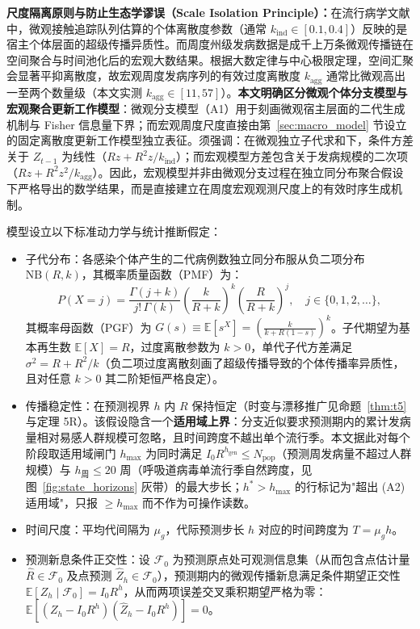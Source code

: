 \documentclass[11pt,a4paper]{article}
\theoremstyle{plain}
\theoremstyle{definition}
\begin{document}
\noindent\textbf{尺度隔离原则与防止生态学谬误（Scale Isolation Principle）：}在流行病学文献中，微观接触追踪队列估算的个体离散度参数（通常 $k_{\text{ind}} \in [0.1, 0.4]$）反映的是宿主个体层面的超级传播异质性\citep{lloyd-smith2005superspreading}。而周度州级发病数据是成千上万条微观传播链在空间聚合与时间池化后的宏观大数结果。根据大数定律与中心极限定理，空间汇聚会显著平抑离散度，故宏观周度发病序列的有效过度离散度 $k_{\text{agg}}$ 通常比微观高出一至两个数量级（本文实测 $k_{\text{agg}} \in [11, 57]$）。\textbf{本文明确区分微观个体分支模型与宏观聚合更新工作模型}：微观分支模型（A1）用于刻画微观宿主层面的二代生成机制与 Fisher 信息量下界；而宏观周度尺度直接由第~\ref{sec:macro_model} 节设立的固定离散度更新工作模型独立表征。须强调：在微观独立子代求和下，条件方差关于 $Z_{t-1}$ 为线性（$Rz + R^2 z / k_{\text{ind}}$）；而宏观模型方差包含关于发病规模的二次项（$Rz + R^2 z^2 / k_{\text{agg}}$）。因此，宏观模型并非由微观分支过程在独立同分布聚合假设下严格导出的数学结果，而是直接建立在周度宏观观测尺度上的有效时序生成机制。

模型设立以下标准动力学与统计推断假定：
\begin{itemize}
\item[(A1)] 子代分布：各感染个体产生的二代病例数独立同分布服从负二项分布 $\text{NB}(R, k)$，其概率质量函数（PMF）为：
\begin{equation}
P(X = j) = \frac{\Gamma(j+k)}{j!\,\Gamma(k)} \left(\frac{k}{R+k}\right)^k \left(\frac{R}{R+k}\right)^j, \quad j \in \{0, 1, 2, \dots\},
\label{eq:nb_pmf}
\end{equation}
其概率母函数（PGF）为 $G(s) \equiv \mathbb{E}[s^X] = \left(\frac{k}{k + R(1-s)}\right)^k$。子代期望为基本再生数 $\mathbb{E}[X] = R$，过度离散参数为 $k > 0$，单代子代方差满足 $\sigma^2 = R + R^2/k$（负二项过度离散刻画了超级传播导致的个体传播率异质性\citep{lloyd-smith2005superspreading, king2015avoidable}，且对任意 $k > 0$ 其二阶矩恒严格良定）。
\item[(A2)] 传播稳定性：在预测视界 $h$ 内 $R$ 保持恒定（时变与漂移推广见命题~\ref{thm:t5} 与定理 5R）。该假设隐含一个\textbf{适用域上界}：分支近似要求预测期内的累计发病量相对易感人群规模可忽略，且时间跨度不越出单个流行季。本文据此对每个阶段取适用域闸门 $h_{\max}$ 为同时满足 $I_0 R^{h_{\text{gen}}} \le N_{\text{pop}}$（预测周发病量不超过人群规模）与 $h_{\text{周}} \le 20$ 周（呼吸道病毒单流行季自然跨度，见图~\ref{fig:state_horizons} 灰带）的最大步长；$h^* > h_{\max}$ 的行标记为"超出 (A2) 适用域"，只报 $\ge h_{\max}$ 而不作为可操作读数。
\item[(A3)] 时间尺度：平均代间隔为 $\mu_g$，代际预测步长 $h$ 对应的时间跨度为 $T = \mu_g h$。
\item[(A4)] 预测新息条件正交性：设 $\mathcal{F}_0$ 为预测原点处可观测信息集（从而包含点估计量 $\hat{R} \in \mathcal{F}_0$ 及点预测 $\hat{Z}_h \in \mathcal{F}_0$），预测期内的微观传播新息满足条件期望正交性 $\mathbb{E}[Z_h \mid \mathcal{F}_0] = I_0 R^h$，从而两项误差交叉乘积期望严格为零：$\mathbb{E}[(Z_h - I_0 R^h)(\hat{Z}_h - I_0 R^h)] = 0$。
\end{itemize}
\end{document}
